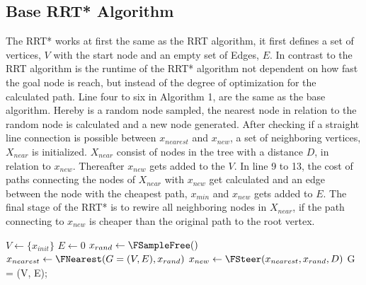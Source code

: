 \subsection{Base RRT* Algorithm}

The RRT* works at first the same as the RRT algorithm, it first defines a set of vertices, $V$ with the start node and an empty set of Edges, $E$. In contrast to the RRT algorithm is the runtime of the RRT* algorithm not dependent on how fast the goal node is reach, but instead of the degree of optimization for the calculated path.
Line four to six in Algorithm 1, are the same as the base algorithm. Hereby is a random node sampled, the nearest node in relation to the random node is calculated and a new node generated. After checking if a straight line connection is possible between $x_{nearest}$ and $x_{new}$, a set of neighboring vertices, $X_{near}$ is initialized.
$X_{near}$ consist of nodes in the tree with a distance $D$, in relation to $x_{new}$. Thereafter $x_{new}$ gets added to the $V$. In line 9 to 13, the cost of paths connecting the nodes of $X_{near}$ with $x_{new}$ get calculated and an edge between the node with the cheapest path, $x_{min}$ and $x_{new}$ gets added to $E$. The final stage of the RRT* is to rewire all neighboring nodes in $X_{near}$, if the path connecting to $x_{new}$ is cheaper than the original path to the root vertex. 

\begin{algorithm}[H]
	\caption{RRT* 2011\footcite{Karaman2011}}
	$V \gets \{x_{init}\}$\;
	$E \gets 0$\;
	 {
		$x_{rand} \gets \FSampleFree()$\;
		$x_{nearest} \gets \FNearest(G = (V, E), x_{rand})$\;
		$x_{new} \gets \FSteer(x_{nearest}, x_{rand}, D)$\;
	}
	\Return G = (V, E);
\end{algorithm}

